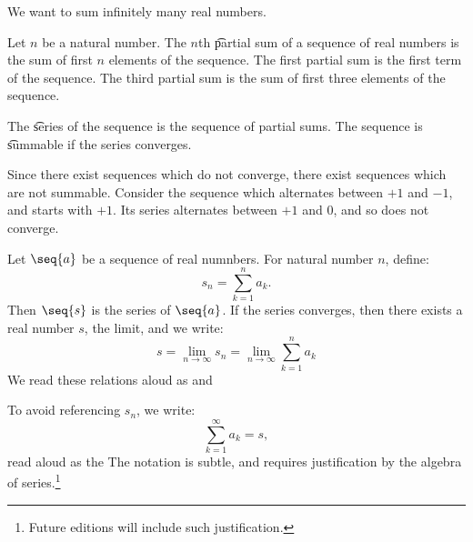 

We want to sum infinitely
many real numbers.



Let $n$ be a natural number.
The $n$th \t{partial sum} of a sequence of real numbers is the sum of first $n$ elements of the sequence.
The first partial sum is the first term of the sequence.
The third partial sum is the sum of first three elements of the sequence.

The \t{series} of the sequence is the sequence of partial sums.
The sequence is \t{summable} if the series converges.

Since there exist sequences which do not converge, there exist sequences which are not summable.
Consider the sequence which alternates between $+1$ and $-1$, and starts with $+1$.
Its series alternates between $+1$ and $0$, and so does not converge.


Let $\seq{a}$ be a sequence of real numnbers.
For natural number $n$, define:
\[
  s_n = \sum_{k = 1}^{n} a_k.
\]
Then $\seq{s}$ is the series
of $\seq{a}$. If the series
converges, then there exists
a real number $s$, the limit,
and we write:
\[
  s = \lim_{n\to\infty} s_n = \lim_{n\to\infty} \sum_{k = 1}^{n} a_k
\]
We read these relations aloud as
 and

To avoid referencing $s_n$, we write:
\[
  \sum_{k = 1}^{\infty} a_k = s,
\]
read aloud as the
The notation is subtle, and
requires justification
by the algebra of series.\footnote{Future editions will include such justification.}
